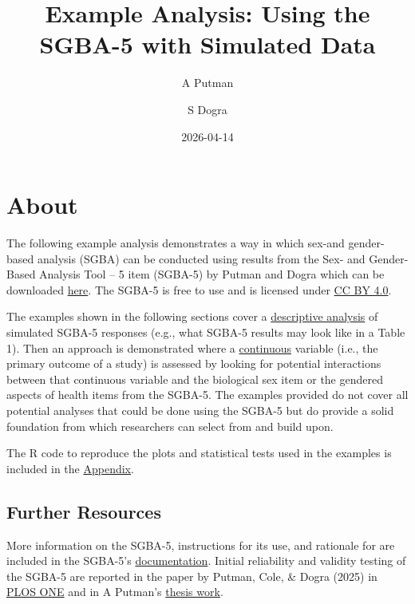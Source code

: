 \documentclass[
]{book}
\title{Example Analysis: Using the SGBA-5 with Simulated Data}
\author{A Putman \and S Dogra}
\date{2026-04-14}
\begin{document}
\maketitle

{
\setcounter{tocdepth}{1}
\tableofcontents
}
\chapter{About}\label{about}

The following example analysis demonstrates a way in which sex-and gender-based analysis (SGBA) can be conducted using results from the Sex- and Gender-Based Analysis Tool -- 5 item (SGBA-5) by Putman and Dogra which can be downloaded \href{https://doi.org/10.1371/journal.pone.0323834.s001}{here}. The SGBA-5 is free to use and is licensed under \href{https://creativecommons.org/licenses/by/4.0/}{CC BY 4.0}.

The examples shown in the following sections cover a \hyperref[descriptive-analysis]{descriptive analysis} of simulated SGBA-5 responses (e.g., what SGBA-5 results may look like in a Table 1). Then an approach is demonstrated where a \hyperref[continuous]{continuous} variable (i.e., the primary outcome of a study) is assessed by looking for potential interactions between that continuous variable and the biological sex item or the gendered aspects of health items from the SGBA-5. The examples provided do not cover all potential analyses that could be done using the SGBA-5 but do provide a solid foundation from which researchers can select from and build upon.

The R code to reproduce the plots and statistical tests used in the examples is included in the \hyperref[appendix]{Appendix}.

\section{Further Resources}\label{further-resources}

More information on the SGBA-5, instructions for its use, and rationale for are included in the SGBA-5's \href{https://figshare.com/articles/journal_contribution/Sex-_and_gender-based_analysis_tool_5-item_v1_0_/29090615?file=54611480}{documentation}. Initial reliability and validity testing of the SGBA-5 are reported in the paper by Putman, Cole, \& Dogra (2025) in \href{https://doi.org/10.1371/journal.pone.0323834}{PLOS ONE} and in A Putman's \href{https://ontariotechu.scholaris.ca/items/fddf2667-8cd6-429d-85bd-74b0076ab561}{thesis work}.
\end{document}
